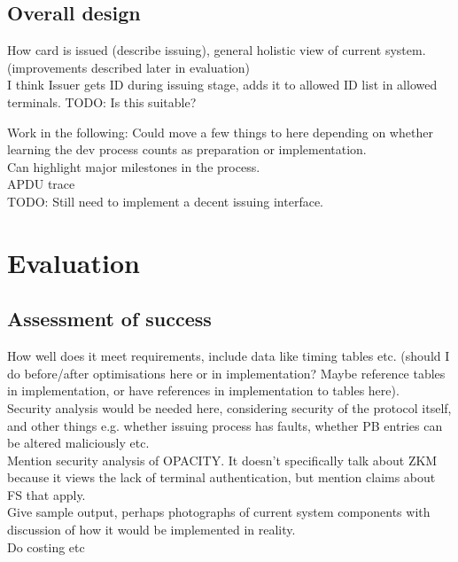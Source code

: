 \documentclass[12pt]{article}
\begin{document}
\subsection{Overall design}
How card is issued (describe issuing), general holistic view of current system. (improvements described later in evaluation)\\
I think Issuer gets ID during issuing stage, adds it to allowed ID list in allowed terminals. TODO: Is this suitable?




Work in the following:
Could move a few things to here depending on whether learning the dev process counts as preparation or implementation.\\
Can highlight major milestones in the process.\\
APDU trace\\

TODO: Still need to implement a decent issuing interface.

\pagebreak



\section{Evaluation}
\subsection{Assessment of success}
How well does it meet requirements, include data like timing tables etc. (should I do before/after optimisations here or in implementation? Maybe reference tables in implementation, or have references in implementation to tables here).\\

Security analysis would be needed here, considering security of the protocol itself, and other things e.g. whether issuing process has faults, whether PB entries can be altered maliciously etc.\\
Mention security analysis of OPACITY. It doesn't specifically talk about ZKM because it views the lack of terminal authentication, but mention claims about FS that apply.\\

Give sample output, perhaps photographs of current system components with discussion of how it would be implemented in reality.\\

Do costing etc\\
\end{document}
